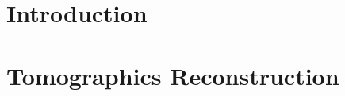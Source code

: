 
\section{Introduction} %
	\label{sec:introduction}


\section{Tomographics Reconstruction} %
	\label{sec:jpeg_image_compression}
	

